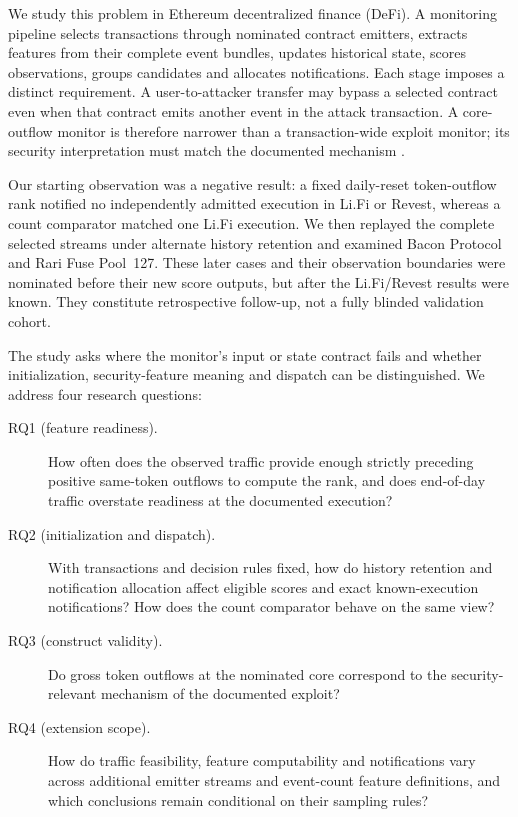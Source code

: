 \documentclass[preprint,12pt,authoryear]{elsarticle}
\begin{document}
We study this problem in Ethereum decentralized finance (DeFi). A monitoring pipeline selects transactions through nominated contract emitters, extracts features from their complete event bundles, updates historical state, scores observations, groups candidates and allocates notifications. Each stage imposes a distinct requirement. A user-to-attacker transfer may bypass a selected contract even when that contract emits another event in the attack transaction. A core-outflow monitor is therefore narrower than a transaction-wide exploit monitor; its security interpretation must match the documented mechanism \citep{Zhou2023SoKDeFi,Wu2024DeFiRanger,Meng2026Houston}.

Our starting observation was a negative result: a fixed daily-reset token-outflow rank notified no independently admitted execution in Li.Fi or Revest, whereas a count comparator matched one Li.Fi execution. We then replayed the complete selected streams under alternate history retention and examined Bacon Protocol and Rari Fuse Pool~127. These later cases and their observation boundaries were nominated before their new score outputs, but after the Li.Fi/Revest results were known. They constitute retrospective follow-up, not a fully blinded validation cohort.

The study asks where the monitor's input or state contract fails and whether initialization, security-feature meaning and dispatch can be distinguished. We address four research questions:
\begin{description}
\item[RQ1 (feature readiness).] How often does the observed traffic provide enough strictly preceding positive same-token outflows to compute the rank, and does end-of-day traffic overstate readiness at the documented execution?
\item[RQ2 (initialization and dispatch).] With transactions and decision rules fixed, how do history retention and notification allocation affect eligible scores and exact known-execution notifications? How does the count comparator behave on the same view?
\item[RQ3 (construct validity).] Do gross token outflows at the nominated core correspond to the security-relevant mechanism of the documented exploit?
\item[RQ4 (extension scope).] How do traffic feasibility, feature computability and notifications vary across additional emitter streams and event-count feature definitions, and which conclusions remain conditional on their sampling rules?
\end{description}
\end{document}
